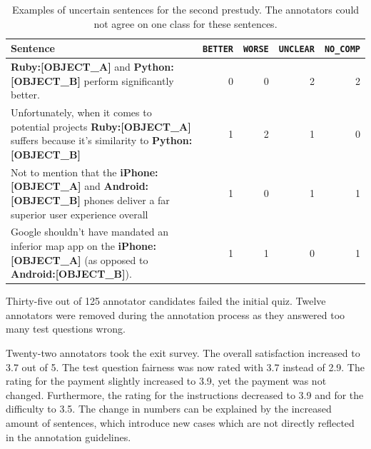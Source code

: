 \begin{table}[tp]
\centering
\caption{Examples of uncertain sentences for the second prestudy. The annotators could not agree on one class for these sentences. }
\label{tbl:pre_2_res}
\begin{tabularx}{\textwidth}{Xrrrr}
\toprule
 Sentence        & \texttt{BETTER} & \texttt{WORSE} & \texttt{UNCLEAR} & \texttt{NO\_COMP}          \\ \midrule
\textbf{{\color[HTML]{9A14B2}Ruby:{[}OBJECT\_A{]}}} and \textbf{{\color[HTML]{6CB219} Python:{[}OBJECT\_B{]}}} perform significantly better. & 0 & 0 & 2 & 2 \\

Unfortunately, when it comes to potential projects \textbf{{\color[HTML]{9A14B2}Ruby:{[}OBJECT\_A{]}}} suffers because it's similarity to \textbf{{\color[HTML]{6CB219} Python:{[}OBJECT\_B{]}}} & 1 & 2 & 1 & 0 \\


Not to mention that the \textbf{{\color[HTML]{9A14B2}iPhone:{[}OBJECT\_A{]}}} and \textbf{{\color[HTML]{6CB219} Android:{[}OBJECT\_B{]}}} phones deliver a far superior user experience overall & 1 & 0 & 1 & 1 \\

Google shouldn't have mandated an inferior map app on the \textbf{{\color[HTML]{9A14B2}iPhone:{[}OBJECT\_A{]}}} (as opposed to \textbf{{\color[HTML]{6CB219} Android:{[}OBJECT\_B{]}}}). & 1 & 1 & 0 & 1 \\



\bottomrule                              
\end{tabularx}
\end{table}

 \FloatBarrier
Thirty-five out of 125 annotator candidates failed the initial quiz. Twelve annotators were removed during the annotation process as they answered too many test questions wrong.

Twenty-two annotators took the exit survey. The overall satisfaction increased to 3.7 out of 5. The test question fairness was now rated with 3.7  instead of 2.9. The rating for the payment slightly increased to 3.9, yet the payment was not changed. Furthermore, the rating for the instructions decreased to 3.9 and for the difficulty to 3.5.
The change in numbers can be explained by the increased amount of sentences, which introduce new cases which are not directly reflected in the annotation guidelines.

